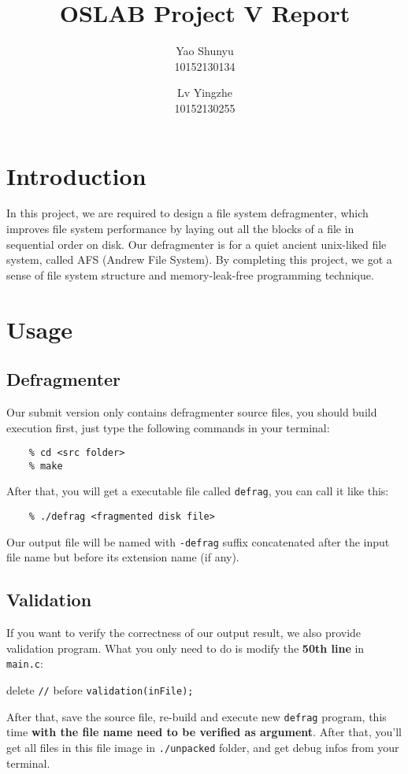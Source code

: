 \documentclass{article}
\title{OSLAB Project V Report}
\author{
	Yao Shunyu\\
	10152130134
	\and
	Lv Yingzhe\\
	10152130255
}
\newcommand{\inline}[1]{\colorbox{shadecolor}{\lstinline{#1}}}
\begin{document}
	\maketitle
	
	\section{Introduction}
	In this project, we are required to design a file system defragmenter, which improves file system performance by laying out all the blocks of a file in sequential order on disk. Our defragmenter is for a quiet ancient unix-liked file system, called AFS (Andrew File System). By completing this project, we got a sense of file system structure and memory-leak-free programming technique.
	
	\section{Usage}
	\subsection{Defragmenter}
	Our submit version only contains defragmenter source files, you should build execution first, just type the following commands in your terminal:
	\begin{lstlisting}
	% cd <src folder>
	% make
	\end{lstlisting}
	After that, you will get a executable file called \inline{defrag}, you can call it like this:
	\begin{lstlisting}
	% ./defrag <fragmented disk file>
	\end{lstlisting}
	Our output file will be named with \inline{-defrag} suffix concatenated after the input file name but before its extension name (if any).
	\subsection{Validation}
	If you want to verify the correctness of our output result, we also provide validation program. What you only need to do is modify the \textbf{50th line} in \inline{main.c}: 
	\begin{center}
		delete \inline{//} before \inline{validation(inFile);}
	\end{center} 
	After that, save the source file, re-build and execute new \inline{defrag} program, this time \textbf{with the file name need to be verified as argument}. After that, you'll get all files in this file image in \inline{./unpacked} folder, and get debug infos from your terminal.
	\newpage
	
\end{document}
